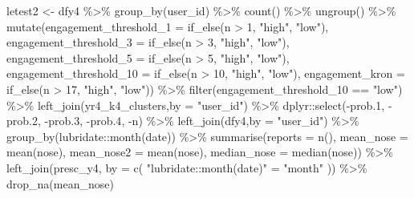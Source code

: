 \documentclass[
]{article}
\newenvironment{Shaded}{\begin{snugshade}}{\end{snugshade}}
\newcommand{\AttributeTok}[1]{\textcolor[rgb]{0.77,0.63,0.00}{#1}}
\newcommand{\DecValTok}[1]{\textcolor[rgb]{0.00,0.00,0.81}{#1}}
\newcommand{\FloatTok}[1]{\textcolor[rgb]{0.00,0.00,0.81}{#1}}
\newcommand{\FunctionTok}[1]{\textcolor[rgb]{0.00,0.00,0.00}{#1}}
\newcommand{\NormalTok}[1]{#1}
\newcommand{\OtherTok}[1]{\textcolor[rgb]{0.56,0.35,0.01}{#1}}
\newcommand{\SpecialCharTok}[1]{\textcolor[rgb]{0.00,0.00,0.00}{#1}}
\newcommand{\StringTok}[1]{\textcolor[rgb]{0.31,0.60,0.02}{#1}}
\begin{document}
\begin{Shaded}
\begin{Highlighting}[]
 
\NormalTok{ letest2 }\OtherTok{\textless{}{-}}\NormalTok{  dfy4 }\SpecialCharTok{\%\textgreater{}\%}
   \FunctionTok{group\_by}\NormalTok{(user\_id) }\SpecialCharTok{\%\textgreater{}\%}
   \FunctionTok{count}\NormalTok{() }\SpecialCharTok{\%\textgreater{}\%}
   \FunctionTok{ungroup}\NormalTok{() }\SpecialCharTok{\%\textgreater{}\%} 
   \FunctionTok{mutate}\NormalTok{(}\AttributeTok{engagement\_threshold\_1 =} \FunctionTok{if\_else}\NormalTok{(n }\SpecialCharTok{\textgreater{}} \DecValTok{1}\NormalTok{, }\StringTok{"high"}\NormalTok{, }\StringTok{"low"}\NormalTok{),}
          \AttributeTok{engagement\_threshold\_3 =} \FunctionTok{if\_else}\NormalTok{(n }\SpecialCharTok{\textgreater{}} \DecValTok{3}\NormalTok{, }\StringTok{"high"}\NormalTok{, }\StringTok{"low"}\NormalTok{),}
          \AttributeTok{engagement\_threshold\_5 =} \FunctionTok{if\_else}\NormalTok{(n }\SpecialCharTok{\textgreater{}} \DecValTok{5}\NormalTok{, }\StringTok{"high"}\NormalTok{, }\StringTok{"low"}\NormalTok{),}
          \AttributeTok{engagement\_threshold\_10 =} \FunctionTok{if\_else}\NormalTok{(n }\SpecialCharTok{\textgreater{}} \DecValTok{10}\NormalTok{, }\StringTok{"high"}\NormalTok{, }\StringTok{"low"}\NormalTok{),}
          \AttributeTok{engagement\_kron =} \FunctionTok{if\_else}\NormalTok{(n }\SpecialCharTok{\textgreater{}} \DecValTok{17}\NormalTok{, }\StringTok{"high"}\NormalTok{, }\StringTok{"low"}\NormalTok{)) }\SpecialCharTok{\%\textgreater{}\%} 
   \FunctionTok{filter}\NormalTok{(engagement\_threshold\_10 }\SpecialCharTok{==} \StringTok{"low"}\NormalTok{) }\SpecialCharTok{\%\textgreater{}\%} 
   \FunctionTok{left\_join}\NormalTok{(yr4\_k4\_clusters,}\AttributeTok{by =} \StringTok{"user\_id"}\NormalTok{) }\SpecialCharTok{\%\textgreater{}\%} 
\NormalTok{   dplyr}\SpecialCharTok{::}\FunctionTok{select}\NormalTok{(}\SpecialCharTok{{-}}\NormalTok{prob}\FloatTok{.1}\NormalTok{,}
                 \SpecialCharTok{{-}}\NormalTok{prob}\FloatTok{.2}\NormalTok{,}
                 \SpecialCharTok{{-}}\NormalTok{prob}\FloatTok{.3}\NormalTok{,}
                 \SpecialCharTok{{-}}\NormalTok{prob}\FloatTok{.4}\NormalTok{,}
                 \SpecialCharTok{{-}}\NormalTok{n) }\SpecialCharTok{\%\textgreater{}\%} 
   \FunctionTok{left\_join}\NormalTok{(dfy4,}\AttributeTok{by =} \StringTok{"user\_id"}\NormalTok{) }\SpecialCharTok{\%\textgreater{}\%}  
   \FunctionTok{group\_by}\NormalTok{(lubridate}\SpecialCharTok{::}\FunctionTok{month}\NormalTok{(date)) }\SpecialCharTok{\%\textgreater{}\%}
   \FunctionTok{summarise}\NormalTok{(}\AttributeTok{reports =} \FunctionTok{n}\NormalTok{(),}
             \AttributeTok{mean\_nose =} \FunctionTok{mean}\NormalTok{(nose),}
             \AttributeTok{mean\_nose2 =} \FunctionTok{mean}\NormalTok{(nose),}
             \AttributeTok{median\_nose =} \FunctionTok{median}\NormalTok{(nose)) }\SpecialCharTok{\%\textgreater{}\%}
   \FunctionTok{left\_join}\NormalTok{(presc\_y4, }\AttributeTok{by =} \FunctionTok{c}\NormalTok{( }\StringTok{"lubridate::month(date)"} \OtherTok{=} \StringTok{"month"}\NormalTok{ )) }\SpecialCharTok{\%\textgreater{}\%} 
   \FunctionTok{drop\_na}\NormalTok{(mean\_nose) }
 

\end{Highlighting}
\end{Shaded}
\end{document}
